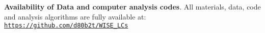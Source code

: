{\bf Availability of Data and computer analysis codes}. 
All materials, data, code and analysis algorithms are fully 
available at: 
\href{https://github.com/d80b2t/WISE\_LCs}{\tt https://github.com/d80b2t/WISE\_LCs}


\smallskip
\smallskip

